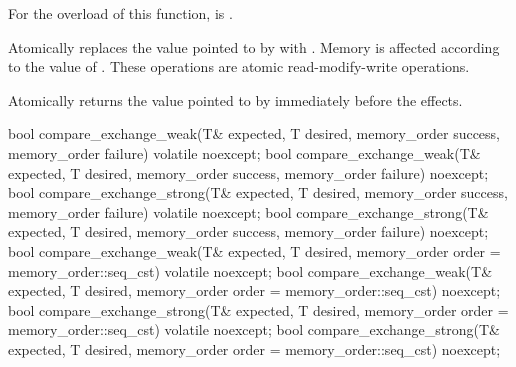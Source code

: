 \begin{itemdescr}
\pnum
\constraints
For the  overload of this function,
 is .

\pnum
\effects
Atomically replaces the value pointed to by 
with .
Memory is affected according to the value of .
These operations are atomic read-modify-write operations.

\pnum
\returns
Atomically returns the value pointed to by  immediately before the effects.
\end{itemdescr}

%
%
%
%
%
%
%
%
%
%
%
%
\begin{itemdecl}
bool compare_exchange_weak(T& expected, T desired,
                           memory_order success, memory_order failure) volatile noexcept;
bool compare_exchange_weak(T& expected, T desired,
                           memory_order success, memory_order failure) noexcept;
bool compare_exchange_strong(T& expected, T desired,
                             memory_order success, memory_order failure) volatile noexcept;
bool compare_exchange_strong(T& expected, T desired,
                             memory_order success, memory_order failure) noexcept;
bool compare_exchange_weak(T& expected, T desired,
                           memory_order order = memory_order::seq_cst) volatile noexcept;
bool compare_exchange_weak(T& expected, T desired,
                           memory_order order = memory_order::seq_cst) noexcept;
bool compare_exchange_strong(T& expected, T desired,
                             memory_order order = memory_order::seq_cst) volatile noexcept;
bool compare_exchange_strong(T& expected, T desired,
                             memory_order order = memory_order::seq_cst) noexcept;
\end{itemdecl}

